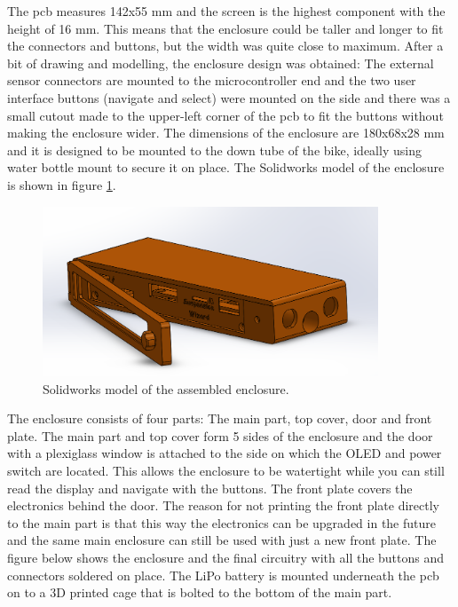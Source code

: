\documentclass[a4paper,11pt]{article}
\begin{document}
The pcb measures 142x55 mm and the screen is the highest component with the height of 16 mm. This means that the enclosure could be taller and longer to fit the connectors and buttons, but the width was quite close to maximum. After a bit of drawing and modelling, the enclosure design was obtained: The external sensor connectors are mounted to the microcontroller end and the two user interface buttons (navigate and select) were mounted on the side and there was a small cutout made to the upper-left corner of the pcb to fit the buttons without making the enclosure wider. The dimensions of the enclosure are 180x68x28 mm and it is designed to be mounted to the down tube of the bike, ideally using water bottle mount to secure it on place. The Solidworks model of the enclosure is shown in figure \ref{fig:enclosure_CAD}.

\begin{figure}[H]
    \centering
    \includegraphics[width=100mm]{Figures/enclosure_assembly.png}
    \caption{Solidworks model of the assembled enclosure.}
    \label{fig:enclosure_CAD}
\end{figure}

The enclosure consists of four parts: The main part, top cover, door and front plate. The main part and top cover form 5 sides of the enclosure and the door with a plexiglass window is attached to the side on which the OLED and power switch are located. This allows the enclosure to be watertight while you can still read the display and navigate with the buttons. The front plate covers the electronics behind the door. The reason for not printing the front plate directly to the main part is that this way the electronics can be upgraded in the future and the same main enclosure can still be used with just a new front plate. The figure below shows the enclosure and the final circuitry with all the buttons and connectors soldered on place. The LiPo battery is mounted underneath the pcb on to a 3D printed cage that is bolted to the bottom of the main part.
\end{document}
